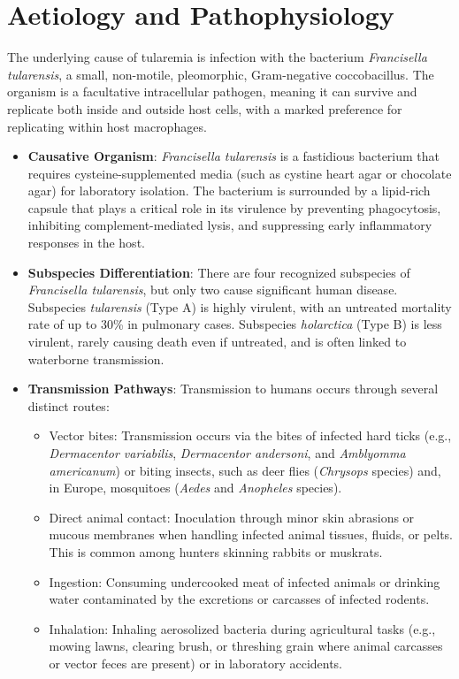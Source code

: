 \section*{Aetiology and Pathophysiology}
The underlying cause of tularemia is infection with the bacterium \textit{Francisella tularensis}, a small, non-motile, pleomorphic, Gram-negative coccobacillus. The organism is a facultative intracellular pathogen, meaning it can survive and replicate both inside and outside host cells, with a marked preference for replicating within host macrophages.
\begin{itemize}
    \item \textbf{Causative Organism}: \textit{Francisella tularensis} is a fastidious bacterium that requires cysteine-supplemented media (such as cystine heart agar or chocolate agar) for laboratory isolation. The bacterium is surrounded by a lipid-rich capsule that plays a critical role in its virulence by preventing phagocytosis, inhibiting complement-mediated lysis, and suppressing early inflammatory responses in the host.
    \item \textbf{Subspecies Differentiation}: There are four recognized subspecies of \textit{Francisella tularensis}, but only two cause significant human disease. Subspecies \textit{tularensis} (Type A) is highly virulent, with an untreated mortality rate of up to 30\% in pulmonary cases. Subspecies \textit{holarctica} (Type B) is less virulent, rarely causing death even if untreated, and is often linked to waterborne transmission.
    \item \textbf{Transmission Pathways}: Transmission to humans occurs through several distinct routes:
    \begin{itemize}
        \item Vector bites: Transmission occurs via the bites of infected hard ticks (e.g., \textit{Dermacentor variabilis}, \textit{Dermacentor andersoni}, and \textit{Amblyomma americanum}) or biting insects, such as deer flies (\textit{Chrysops} species) and, in Europe, mosquitoes (\textit{Aedes} and \textit{Anopheles} species).
        \item Direct animal contact: Inoculation through minor skin abrasions or mucous membranes when handling infected animal tissues, fluids, or pelts. This is common among hunters skinning rabbits or muskrats.
        \item Ingestion: Consuming undercooked meat of infected animals or drinking water contaminated by the excretions or carcasses of infected rodents.
        \item Inhalation: Inhaling aerosolized bacteria during agricultural tasks (e.g., mowing lawns, clearing brush, or threshing grain where animal carcasses or vector feces are present) or in laboratory accidents.

\end{itemize}
\end{itemize}
